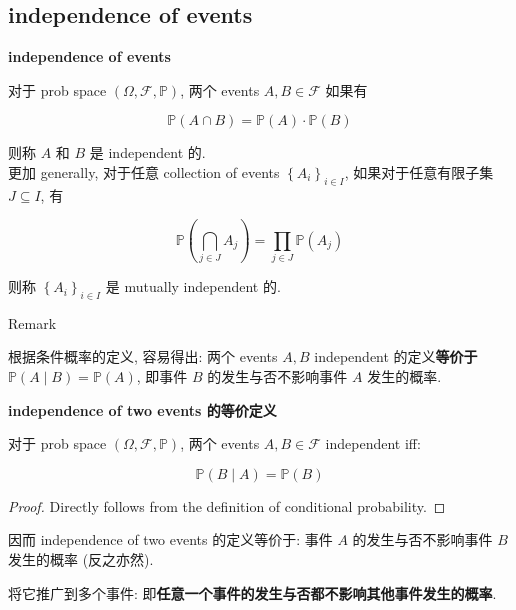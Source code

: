 \documentclass{qlnotes-export}
\begin{document}
\subsection{independence of events}\label{independence-of-events}

\begin{definition}{\protect{}\label{kn-independence-of-events}{\textbf{independence
of events}}}

对于 prob space \((\Omega,\mathcal{F},{\mathbb{P}})\), 两个 events \(A,B \in \mathcal{F}\) 如果有

\[{\mathbb{P}}(A \cap B) = {\mathbb{P}}(A) \cdot {\mathbb{P}}(B)\]

则称 \(A\) 和 \(B\) 是 independent 的.\\
更加 generally, 对于任意 collection of events \(\left\{ A_{i} \right\}_{i \in I}\), 如果对于任意有限子集 \(J \subseteq I\), 有

\[{\mathbb{P}}\left( {\bigcap\limits_{j \in J}A_{j}} \right) = \prod\limits_{j \in J}{\mathbb{P}}(A_{j})\]

则称 \(\left\{ A_{i} \right\}_{i \in I}\) 是 mutually independent 的.

\end{definition}

\begin{qlremark}{Remark}

根据条件概率的定义, 容易得出: 两个 events \(A,B\) independent 的定义\textbf{等价于 \({\mathbb{P}}(A \mid B) = {\mathbb{P}}(A)\)}, 即事件 \(B\) 的发生与否不影响事件 \(A\) 发生的概率.\\

\begin{proposition}{\protect{}\label{kn-independence-of-two-events}{\textbf{independence
of two events 的等价定义}}}

对于 prob space \((\Omega,\mathcal{F},{\mathbb{P}})\), 两个 events \(A,B \in \mathcal{F}\) independent iff:

\[{\mathbb{P}}(B \mid A) = {\mathbb{P}}(B)\]

\end{proposition}

\begin{proof}

Directly follows from the definition of conditional probability.

\end{proof}

因而 independence of two events 的定义等价于: 事件 \(A\) 的发生与否不影响事件 \(B\) 发生的概率 (反之亦然).

将它推广到多个事件: 即\textbf{任意一个事件的发生与否都不影响其他事件发生的概率}.

\end{qlremark}
\end{document}
